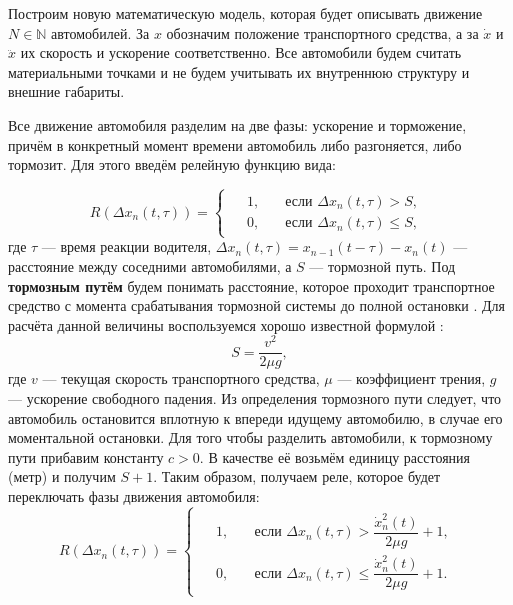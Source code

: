 \documentclass[12pt, a4paper]{extarticle}
\numberwithin{equation}{section}
\numberwithin{figure}{section}
\begin{document}
Построим новую математическую модель, которая будет описывать движение $N \in \mathbb{N}$ автомобилей. За $x$ обозначим положение транспортного средства, а за $\dot{x}$ и $\ddot{x}$ их скорость и ускорение соответственно. Все автомобили будем считать материальными точками и не будем учитывать их внутреннюю структуру и внешние габариты.

Все движение автомобиля разделим на две фазы: ускорение и торможение, причём в конкретный момент времени автомобиль либо разгоняется, либо тормозит. Для этого введём релейную функцию вида:

\begin{equation*}
R(\Delta x_{n}(t,\tau))=
\begin{cases}
\begin{split}
&1,\quad &\text{если }\Delta x_{n}(t,\tau) >S, \\
&0,\quad &\text{если }\Delta x_{n}(t,\tau) \leq S,
\end{split}
\end{cases}
\end{equation*}
где $\tau$ --- время реакции водителя, $\Delta x_{n}(t,\tau)=x_{n-1}(t-\tau)-x_n(t)$ --- расстояние между соседними автомобилями, а $S$ --- тормозной путь. Под \textbf{тормозным путём} будем понимать расстояние, которое проходит транспортное средство с момента срабатывания тормозной системы до полной остановки \cite{PDD}. Для расчёта данной величины воспользуемся хорошо известной формулой \cite{Physics}:
\begin{equation*} 
S=\dfrac{v^2}{2\mu g},
\end{equation*}
где $v$ --- текущая скорость транспортного средства, $\mu$ --- коэффициент трения, $g$ --- ускорение свободного падения. Из определения тормозного пути следует, что автомобиль остановится вплотную к впереди идущему автомобилю, в случае его моментальной остановки. Для того чтобы разделить автомобили, к тормозному пути прибавим константу $c > 0$. В качестве её возьмём единицу расстояния (метр) и получим $S+1$. Таким образом, получаем реле, которое будет переключать фазы движения автомобиля:
\begin{equation}\label{rele}
R(\Delta x_{n}(t,\tau))=
\begin{cases}
\begin{split}
&1,\quad &\text{если }\Delta x_{n}(t,\tau) > \dfrac{\dot{x}_n^2(t)}{2\mu g}+1, \\
&0,\quad &\text{если }\Delta x_{n}(t,\tau) \leq \dfrac{\dot{x}_n^2(t)}{2\mu g}+1.
\end{split}
\end{cases}
\end{equation}
\end{document}

